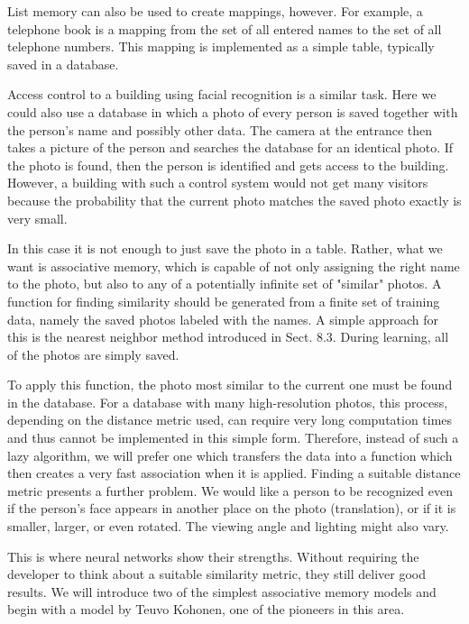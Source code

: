 \documentclass[10pt]{book}
\begin{document}
List memory can also be used to create mappings, however. For example, a telephone book is a mapping from the set of all entered names to the set of all telephone numbers. This mapping is implemented as a simple table, typically saved in a database.

Access control to a building using facial recognition is a similar task. Here we could also use a database in which a photo of every person is saved together with the person's name and possibly other data. The camera at the entrance then takes a picture of the person and searches the database for an identical photo. If the photo is found, then the person is identified and gets access to the building. However, a building with such a control system would not get many visitors because the probability that the current photo matches the saved photo exactly is very small.

In this case it is not enough to just save the photo in a table. Rather, what we want is associative memory, which is capable of not only assigning the right name to the photo, but also to any of a potentially infinite set of "similar" photos. A function for finding similarity should be generated from a finite set of training data, namely the saved photos labeled with the names. A simple approach for this is the nearest neighbor method introduced in Sect. 8.3. During learning, all of the photos are simply saved.

To apply this function, the photo most similar to the current one must be found in the database. For a database with many high-resolution photos, this process, depending on the distance metric used, can require very long computation times and thus cannot be implemented in this simple form. Therefore, instead of such a lazy algorithm, we will prefer one which transfers the data into a function which then creates a very fast association when it is applied.
Finding a suitable distance metric presents a further problem. We would like a person to be recognized even if the person's face appears in another place on the photo (translation), or if it is smaller, larger, or even rotated. The viewing angle and lighting might also vary.

This is where neural networks show their strengths. Without requiring the developer to think about a suitable similarity metric, they still deliver good results. We will introduce two of the simplest associative memory models and begin with a model by Teuvo Kohonen, one of the pioneers in this area.
\end{document}
